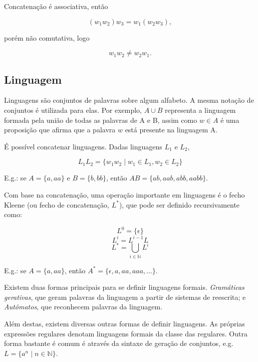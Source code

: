 \documentclass[a4paper,12pt,oneside,onecolumn]{uerj}
\begin{document}
Concatenação é associativa, então 

\begin{equation*}
(w_1w_2)w_3 = w_1(w_2w_3),
\end{equation*}

porém não comutativa, logo

\begin{equation*}
w_1w_2 \neq w_2w_1.
\end{equation*}

\subsection{Linguagem}

Linguagens são conjuntos de palavras sobre algum alfabeto. A mesma notação de conjuntos é utilizada para elas. Por exemplo, $A \cup B$ representa a linguagem formada pela união de todas as palavras de A e B, assim como $w \in A$ é uma proposição que afirma que a palavra $w$ está presente na linguagem A.

É possível concatenar linguagens. Dadas linguagens $L_1$ e $L_2$,

\begin{equation*}
	L_1L_2 = \{w_1w_2 \mid w_1 \in L_1, w_2 \in L_2\}
\end{equation*}

E.g.: se $A = \{a, aa\}$ e $B = \{b, bb\}$, então $AB = \{ab, aab, abb, aabb\}$.


Com base na concatenação, uma operação importante em linguagens é o fecho Kleene (ou fecho de concatenação, $L^*$), que pode ser definido recursivamente como:

\begin{equation*}
	L^0 = \{\epsilon\}
\end{equation*}
\begin{equation*}
	L^i = L^{i-1}L
\end{equation*}
\begin{equation*}
	L^* = \bigcup_{i \in \mathbb{N}} L^i
\end{equation*}

E.g.: se $A = \{a, aa\}$, então $A^* = \{\epsilon, a, aa, aaa, \ldots\}$.

Existem duas formas principais para se definir linguagens formais. \emph{Gramáticas gerativas}, que geram palavras da linguagem a partir de sistemas de reescrita; e \emph{Autômatos}, que reconhecem palavras da linguagem. 

Além destas, existem diversas outras formas de definir linguagens. As próprias expressões regulares denotam linguagens formais da classe das regulares. Outra forma bastante é comum é através da sintaxe de geração de conjuntos, e.g. $L=\{a^n \mid n \in \mathbb{N}\}$.
\end{document}
